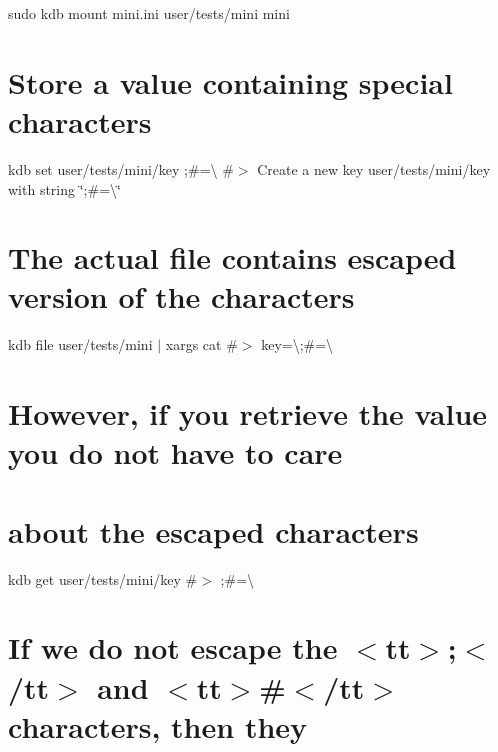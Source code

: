 \begin{DoxyCode}{0}
\DoxyCodeLine{}
\DoxyCodeLine{}
\DoxyCodeLine{}
\end{DoxyCode}
 sudo kdb mount mini.\+ini user/tests/mini mini\hypertarget{autotoc_md402_autotoc_md412}{}\section{Store a value containing special characters}\label{autotoc_md402_autotoc_md412}
kdb set user/tests/mini/key \textquotesingle{};\#=\textbackslash{}\textquotesingle{} \#$>$ Create a new key user/tests/mini/key with string \char`\"{};\#=\textbackslash{}\char`\"{}\hypertarget{autotoc_md402_autotoc_md413}{}\section{The actual file contains escaped version of the characters}\label{autotoc_md402_autotoc_md413}
kdb file user/tests/mini $\vert$ xargs cat \#$>$ key=\textbackslash{};\#=\textbackslash{}\hypertarget{autotoc_md402_autotoc_md414}{}\section{However, if you retrieve the value you do not have to care}\label{autotoc_md402_autotoc_md414}
\hypertarget{autotoc_md402_autotoc_md415}{}\section{about the escaped characters}\label{autotoc_md402_autotoc_md415}
kdb get user/tests/mini/key \#$>$ ;\#=\textbackslash{}\hypertarget{autotoc_md402_autotoc_md416}{}\section{If we do not escape the $<$tt$>$;$<$/tt$>$ and $<$tt$>$\#$<$/tt$>$ characters, then they}\label{autotoc_md402_autotoc_md416}
